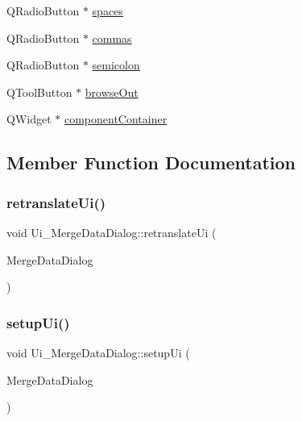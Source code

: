 \begin{DoxyCompactItemize}
\item 
Q\+Radio\+Button $\ast$ \mbox{\hyperlink{class_ui___merge_data_dialog_a748399e9f851d5220ab75548f7eadc3b}{spaces}}
\item 
Q\+Radio\+Button $\ast$ \mbox{\hyperlink{class_ui___merge_data_dialog_adee105d588b178df90508ec6183c5486}{commas}}
\item 
Q\+Radio\+Button $\ast$ \mbox{\hyperlink{class_ui___merge_data_dialog_aa974a43746080239589ea722f2b4d28a}{semicolon}}
\item 
Q\+Tool\+Button $\ast$ \mbox{\hyperlink{class_ui___merge_data_dialog_a0d9a9ff808d8b9c31e71c55986896a0b}{browse\+Out}}
\item 
Q\+Widget $\ast$ \mbox{\hyperlink{class_ui___merge_data_dialog_af439263733bdcf393f9e3e2ec076f4aa}{component\+Container}}
\end{DoxyCompactItemize}


\subsection{Member Function Documentation}
\mbox{\label{class_ui___merge_data_dialog_aa488700be47cbedf2459bf0dbd8f2a73}} 
\subsubsection{\texorpdfstring{retranslateUi()}{retranslateUi()}}
{\footnotesize\ttfamily void Ui\+\_\+\+Merge\+Data\+Dialog\+::retranslate\+Ui (\begin{DoxyParamCaption}\item[{Q\+Dialog $\ast$}]{Merge\+Data\+Dialog }\end{DoxyParamCaption})\hspace{0.3cm}{\ttfamily [inline]}}

\mbox{\label{class_ui___merge_data_dialog_ae2ee4a26cebe1ba0ae938ddef5b970d6}} 
\subsubsection{\texorpdfstring{setupUi()}{setupUi()}}
{\footnotesize\ttfamily void Ui\+\_\+\+Merge\+Data\+Dialog\+::setup\+Ui (\begin{DoxyParamCaption}\item[{Q\+Dialog $\ast$}]{Merge\+Data\+Dialog }\end{DoxyParamCaption})\hspace{0.3cm}{\ttfamily [inline]}}



